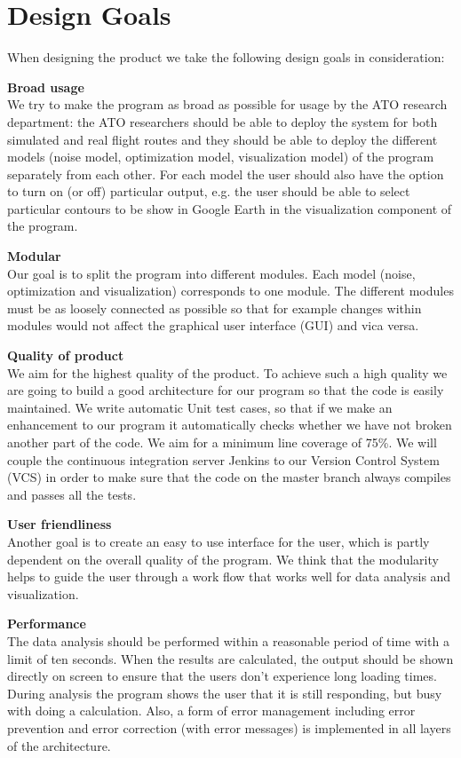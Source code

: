 \section{Design Goals}
When designing the product we take the following design goals in consideration:

\textbf{Broad usage} \\
We try to make the program as broad as possible for usage by the ATO research department: the ATO researchers should be able to deploy the system for both simulated and real flight routes and they should be able to deploy the different models (noise model, optimization model, visualization model) of the program separately from each other. For each model the user should also have the option to turn on (or off) particular output, e.g. the user should be able to select particular contours to be show in Google Earth in the visualization component of the program.


\textbf{Modular}\\
Our goal is to split the program into different modules. Each model (noise, optimization and visualization) corresponds to one module. The different modules must be as loosely connected as possible so that for example changes within modules would not affect the graphical user interface (GUI) and vica versa.


\textbf{Quality of product}\\
We aim for the highest quality of the product. To achieve such a high quality we are going to build a good architecture for our program so that the code is easily maintained. We write automatic Unit test cases, so that if we make an enhancement to our program it automatically checks whether we have not broken another part of the code. We aim for a minimum line coverage of 75\%. We will couple the continuous integration server Jenkins to our Version Control System (VCS) in order to make sure that the code on the master branch always compiles and passes all the tests.

\textbf{User friendliness}\\
Another goal is to create an easy to use interface for the user, which is partly dependent on the overall quality of the program. We think that the modularity helps to guide the user through a work flow that works well for data analysis and visualization.

\textbf{Performance} \\
The data analysis should be performed within a reasonable period of time with a limit of ten seconds. When the results are calculated, the output should be shown directly on screen to ensure that the users don't experience long loading times. During analysis the program shows the user that it is still responding, but busy with doing a calculation. Also, a form of error management including error prevention and error correction (with error messages) is implemented in all layers of the architecture.

